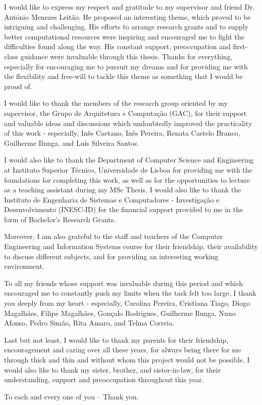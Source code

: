 
I would like to express my respect and gratitude to my supervisor and friend Dr. António Menezes Leitão. He proposed an interesting theme, which proved to be intriguing and challenging. His efforts to arrange research grants and to supply better computational resources were inspiring and encouraged me to fight the difficulties found along the way. His constant support, preoccupation and first-class guidance were invaluable through this thesis. Thanks for everything, especially for encouraging me to pursuit my dreams and for providing me with the flexibility and free-will to tackle this theme as something that I would be proud of.  

I would like to thank the members of the research group oriented by my supervisor, the Grupo de Arquitetura e Computação (GAC), for their support and valuable ideas and discussions which undoubtedly improved the practicality of this work - especially, Inês Caetano, Inês Pereira, Renata Castelo Branco, Guilherme Ilunga, and Luís Silveira Santos. 

I would also like to thank the Department of Computer Science and Engineering at Instituto Superior Técnico, Universidade de Lisboa for providing me with the foundations for completing this work, as well as for the opportunities to lecture as a teaching assistant during my MSc Thesis. I would also like to thank the Instituto de Engenharia de Sistemas e Computadores - Investigação e Desenvolvimento (INESC-ID) for the financial support provided to me in the form of Bachelor's Research Grants.


Moreover, I am also grateful to the staff and teachers of the Computer Engineering and Information Systems course for their friendship, their availability to discuss different subjects, and for providing an interesting working environment. 

To all my friends whose support was invaluable during this period and which encouraged me to constantly push my limits when the task felt too large, I thank you deeply from my heart - especially, Carolina Pereira, Cristiana Tiago, Diogo Magalhães, Filipe Magalhães, Gonçalo Rodrigues, Guilherme Ilunga, Nuno Afonso, Pedro Simão, Rita Amaro, and Telma Correia.

Last but not least, I would like to thank my parents for their friendship, encouragement and caring over all these years, for always being there for me through thick and thin and without whom this project would not be possible. I would also like to thank my sister, brother, and sister-in-law, for their understanding, support and preoccupation throughout this year.

To each and every one of you -- Thank you.